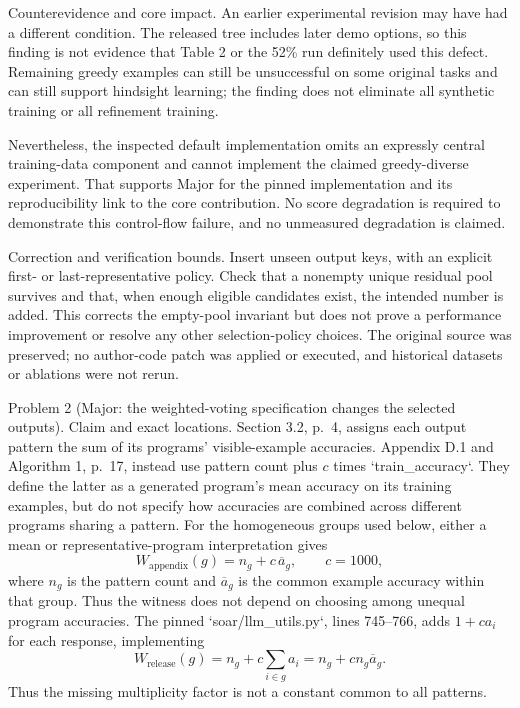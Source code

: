\documentclass[10pt]{article}
\begin{document}
Counterevidence and core impact. An earlier experimental revision may have had a different condition. The released tree includes later demo options, so this finding is not evidence that Table 2 or the 52\% run definitely used this defect. Remaining greedy examples can still be unsuccessful on some original tasks and can still support hindsight learning; the finding does not eliminate all synthetic training or all refinement training.\par
Nevertheless, the inspected default implementation omits an expressly central training-data component and cannot implement the claimed greedy-diverse experiment. That supports Major for the pinned implementation and its reproducibility link to the core contribution. No score degradation is required to demonstrate this control-flow failure, and no unmeasured degradation is claimed.\par
Correction and verification bounds. Insert unseen output keys, with an explicit first- or last-representative policy. Check that a nonempty unique residual pool survives and that, when enough eligible candidates exist, the intended number is added. This corrects the empty-pool invariant but does not prove a performance improvement or resolve any other selection-policy choices. The original source was preserved; no author-code patch was applied or executed, and historical datasets or ablations were not rerun.\par
Problem 2 (Major: the weighted-voting specification changes the selected outputs).  Claim and exact locations. Section 3.2, p. 4, assigns each output pattern the sum of its programs’ visible-example accuracies. Appendix D.1 and Algorithm 1, p. 17, instead use pattern count plus \(c\) times `train\_accuracy`. They define the latter as a generated program’s mean accuracy on its training examples, but do not specify how accuracies are combined across different programs sharing a pattern. For the homogeneous groups used below, either a mean or representative-program interpretation gives \[W_{\mathrm{appendix}}(g)=n_g+c\,\overline a_g,\qquad c=1000,\] where \(n_g\) is the pattern count and \(\overline a_g\) is the common example accuracy within that group. Thus the witness does not depend on choosing among unequal program accuracies. The pinned `soar/llm\_utils.py`, lines 745–766, adds \(1+c a_i\) for each response, implementing \[W_{\mathrm{release}}(g)=n_g+c\sum_{i\in g}a_i
                       =n_g+c n_g\overline a_g.\] Thus the missing multiplicity factor is not a constant common to all patterns.\par
\end{document}
